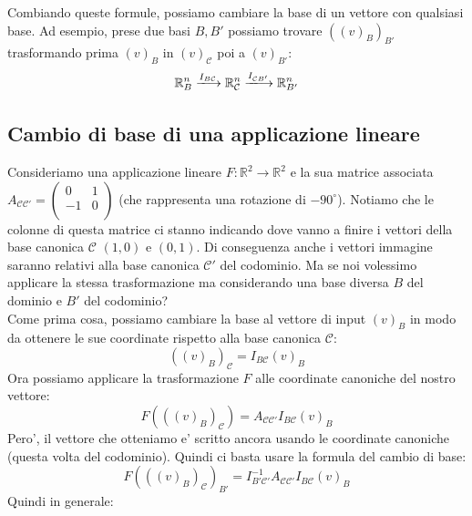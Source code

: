 \documentclass{report}
\begin{document}
Combiando queste formule, possiamo cambiare la base di un vettore con qualsiasi base. Ad esempio, prese due basi $ B, B' $ possiamo trovare $ ((v)_B)_{B'} $ trasformando prima $ (v)_B $ in $ (v)_\mathcal{C} $ poi a $ (v)_{B'} $: 
\[
  \mathbb{R}^n_B \xlongrightarrow{I_{B\mathcal{C}}} \mathbb{R}^n_\mathcal{C} \xlongrightarrow{I_{\mathcal{C}B'}} \mathbb{R}^n_{B'}
\]
\subsection{Cambio di base di una applicazione lineare}
Consideriamo una applicazione lineare $ F:\mathbb{R}^2\to\mathbb{R}^2 $ e la sua matrice associata $ A_{\mathcal{C}\mathcal{C}'} = \begin{pmatrix}
0 & 1\\
-1 & 0\\
\end{pmatrix} $ (che rappresenta una rotazione di $ -90^\circ $). Notiamo che le colonne di questa matrice ci stanno indicando dove vanno a finire i vettori della base canonica $ \mathcal{C} $ $ (1,0) $ e $ (0,1) $. Di conseguenza anche i vettori immagine saranno relativi alla base canonica $ \mathcal{C}' $ del codominio. Ma se noi volessimo applicare la stessa trasformazione ma considerando una base diversa $ B $ del dominio e $ B' $ del codominio?\\
Come prima cosa, possiamo cambiare la base al vettore di input $ (v)_B $ in modo da ottenere le sue coordinate rispetto alla base canonica $ \mathcal{C} $:
\[
  ((v)_B)_\mathcal{C} = I_{B\mathcal{C}}(v)_B
\]
Ora possiamo applicare la trasformazione $ F $ alle coordinate canoniche del nostro vettore:
\[
  F(((v)_B)_\mathcal{C}) = A_{\mathcal{C}\mathcal{C}'}I_{B\mathcal{C}}(v)_B
\]
Pero', il vettore che otteniamo e' scritto ancora usando le coordinate canoniche (questa volta del codominio). Quindi ci basta usare la formula del cambio di base:
\[
  F(((v)_B)_\mathcal{C})_{B'} = I_{B'\mathcal{C}'}^{-1}A_{\mathcal{C}\mathcal{C}'}I_{B\mathcal{C}}(v)_B
\]
Quindi in generale:
\end{document}
